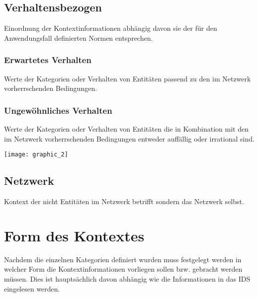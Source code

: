 \subsection{Verhaltensbezogen}
Einordnung der Kontextinformationen abhängig davon sie der für den Anwendungsfall definierten Normen entsprechen.
\subsubsection{Erwartetes Verhalten}
Werte der Kategorien oder Verhalten von Entitäten passend  zu den im Netzwerk vorherrschenden Bedingungen.
\subsubsection{Ungewöhnliches Verhalten}
Werte der Kategorien oder Verhalten von Entitäten die in Kombination mit den im Netzwerk vorherrschenden Bedingungen entweder auffällig oder irrational sind.

\newpage
\texttt{[image: graphic\_2]}

\subsection{Netzwerk}
Kontext der nicht Entitäten im Netzwerk betrifft sondern das Netzwerk selbst. 
\section{Form des Kontextes}
Nachdem die einzelnen Kategorien definiert wurden muss festgelegt werden in welcher Form die Kontextinformationen vorliegen sollen bzw. gebracht werden müssen. Dies ist hauptsächlich davon abhängig wie die Informationen in das IDS eingelesen werden.



